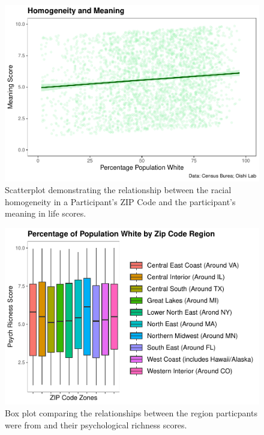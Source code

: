 \documentclass[
  man,floatsintext]{apa7}
\begin{document}
\begin{figure}[H]
\includegraphics[width=0.7\linewidth]{Richness-Diversity-Markdown_files/figure-latex/c-path-scatterplot-1} \caption{Scatterplot demonstrating the relationship between the racial homogeneity in a Participant's ZIP Code and the participant's meaning in life scores.}\label{fig:meaning-appendix}
\end{figure}

\begin{figure}[H]
\includegraphics[width=0.7\linewidth]{Richness-Diversity-Markdown_files/figure-latex/f-path-box-1} \caption{Box plot comparing the relationships between the region particpants were from and their psychological richness scores.}\label{fig:box-appendix}
\end{figure}
\end{document}
